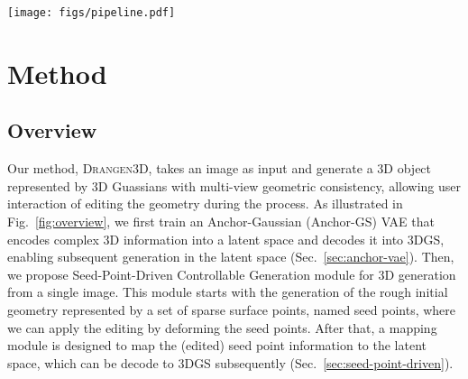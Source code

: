 \begin{figure*}[hbt]
  \centering
  \texttt{[image: figs/pipeline.pdf]} 
  \caption{Overview of the framework.}
  \label{fig:overview}
\end{figure*}

\section{Method}
\subsection{Overview}
Our method, \textsc{Drangen3D}, takes an image as input and generate a 3D object represented by 3D Guassians with multi-view geometric consistency, allowing user interaction of editing the geometry during the process. As illustrated in Fig.~\ref{fig:overview}, we first train an Anchor-Gaussian (Anchor-GS) VAE that encodes complex 3D information into a latent space and decodes it into 3DGS, enabling subsequent generation in the latent space (Sec.~\ref{sec:anchor-vae}).  
%
Then, we propose Seed-Point-Driven Controllable Generation module for 3D generation from a single image. This module starts with the generation of the rough initial geometry represented by a set of sparse surface points, named seed points, where we can apply the editing by deforming the seed points. After that, a mapping module is designed to map the (edited) seed point information to the latent space, which can be decode to 3DGS subsequently (Sec.~\ref{sec:seed-point-driven}). 





